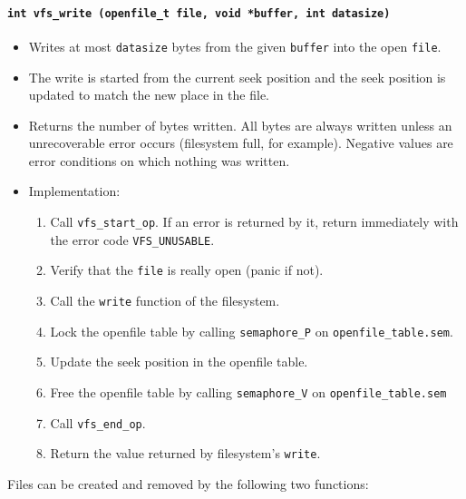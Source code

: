 \documentclass[twoside,a4paper]{report}
\makeatletter
\newenvironment{function}[3]{%
\paragraph{\texttt{#1 {\textbf{#2}} (#3)}}%
\index{#2@\texttt{#2}}%
\begin{itemize}%
}{%
\end{itemize}%
}
\makeatother
\begin{document}
\begin{function}{int}{vfs\_write}{openfile\_t file, void *buffer, int datasize}

\item Writes at most \texttt{datasize} bytes from the given
\texttt{buffer} into the open \texttt{file}.

\item The write is started from the current seek position and the seek
position is updated to match the new place in the file.

\item Returns the number of bytes written. All bytes are always
written unless an unrecoverable error occurs (filesystem full, for
example). Negative values are error conditions on which nothing was written.

\item Implementation:
\begin{enumerate}

\item Call \texttt{vfs\_start\_op}. If an error is returned by it,
 return immediately with the error code \texttt{VFS\_UNUSABLE}.

\item Verify that the \texttt{file} is really open (panic if not).

\item Call the \texttt{write} function of the filesystem.

\item Lock the openfile table by calling \texttt{semaphore\_P} on
\texttt{openfile\_table.sem}.

\item Update the seek position in the openfile table.

\item Free the openfile table by calling \texttt{semaphore\_V} on
\texttt{openfile\_table.sem}

\item Call \texttt{vfs\_end\_op}.

\item Return the value returned by filesystem's \texttt{write}.

\end{enumerate}
\end{function}

Files can be created and removed by the following two functions:
\end{document}
